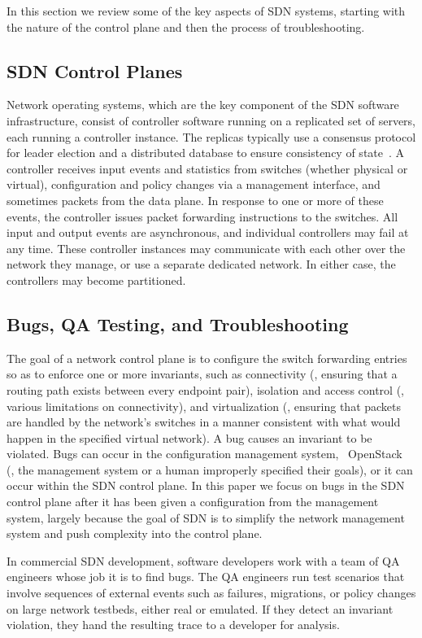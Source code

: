 In this section we review some of the key aspects of SDN systems, starting with the nature of the control plane and then the process of troubleshooting.

\subsection{SDN Control Planes}
Network operating systems, which are the key component of the SDN software
infrastructure, consist of controller software running on a replicated set of
servers, each running a controller instance. The replicas typically use a
consensus protocol for leader election and a distributed database to ensure
consistency of state~\cite{onix}. A controller receives input events and
statistics from switches (whether physical or virtual), configuration and
policy changes via a management interface, and sometimes packets from the data
plane. In response to one or more of these events, the
controller issues packet forwarding instructions to the switches.  All input
and output events are asynchronous, and individual controllers may fail at any
time. These controller instances may communicate
with each other over the network they manage, or use a separate dedicated
network. In either case, the controllers may become partitioned.

\subsection{Bugs, QA Testing, and Troubleshooting}
The goal of a network control plane is to configure the switch forwarding entries so as to
enforce one or more invariants, such as connectivity (\ie, ensuring that a
routing path exists between every endpoint pair), isolation and access control (\ie, various limitations on
connectivity), and virtualization (\ie, ensuring that packets are handled by
the network's switches in a manner consistent with what would happen in the specified virtual
network). A bug causes an invariant to be violated. Bugs can occur in the
configuration management system, \eg~OpenStack~\cite{quantum} (\ie, the
management system or a human improperly specified their goals), or it
can occur within the SDN control plane. In this paper we focus on bugs in the
SDN control plane after it has been given a configuration from the management
system, largely because the goal of SDN is to simplify the network management
system and push complexity into the control plane.

In commercial SDN development, software developers work with a team of QA engineers whose
job it is to find bugs.  The QA engineers run test scenarios that involve
sequences of external events such as failures, migrations, or policy changes
on large network testbeds, either real or emulated.
If they detect an invariant violation, they hand the resulting trace to a developer for analysis.

